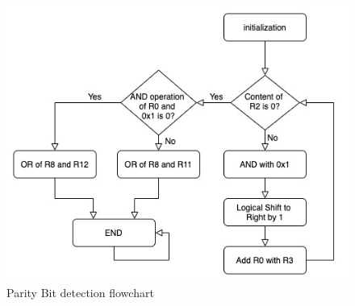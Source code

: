 \documentclass[titlepage]{article}
\begin{document}
	\begin{figure}[t]
		\centering
		\includegraphics[scale=.6]{../images/flowchart_2.jpg}
		\caption{Parity Bit detection flowchart}
	\end{figure}
\end{document}
